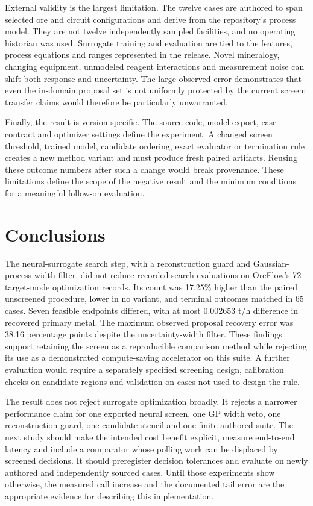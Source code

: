 \documentclass[10pt]{article}
\begin{document}
External validity is the largest limitation. The twelve cases are authored to span selected ore and circuit configurations and derive from the repository's process model. They are not twelve independently sampled facilities, and no operating historian was used. Surrogate training and evaluation are tied to the features, process equations and ranges represented in the release. Novel mineralogy, changing equipment, unmodeled reagent interactions and measurement noise can shift both response and uncertainty. The large observed error demonstrates that even the in-domain proposal set is not uniformly protected by the current screen; transfer claims would therefore be particularly unwarranted.

Finally, the result is version-specific. The source code, model export, case contract and optimizer settings define the experiment. A changed screen threshold, trained model, candidate ordering, exact evaluator or termination rule creates a new method variant and must produce fresh paired artifacts. Reusing these outcome numbers after such a change would break provenance. These limitations define the scope of the negative result and the minimum conditions for a meaningful follow-on evaluation.

\section{Conclusions}
The neural-surrogate search step, with a reconstruction guard and Gaussian-process width filter, did not reduce recorded search evaluations on OreFlow's 72 target-mode optimization records. Its count was 17.25\% higher than the paired unscreened procedure, lower in no variant, and terminal outcomes matched in 65 cases. Seven feasible endpoints differed, with at most 0.002653 t/h difference in recovered primary metal. The maximum observed proposal recovery error was 38.16 percentage points despite the uncertainty-width filter. These findings support retaining the screen as a reproducible comparison method while rejecting its use as a demonstrated compute-saving accelerator on this suite. A further evaluation would require a separately specified screening design, calibration checks on candidate regions and validation on cases not used to design the rule.

The result does not reject surrogate optimization broadly. It rejects a narrower performance claim for one exported neural screen, one GP width veto, one reconstruction guard, one candidate stencil and one finite authored suite. The next study should make the intended cost benefit explicit, measure end-to-end latency and include a comparator whose polling work can be displaced by screened decisions. It should preregister decision tolerances and evaluate on newly authored and independently sourced cases. Until those experiments show otherwise, the measured call increase and the documented tail error are the appropriate evidence for describing this implementation.
\end{document}
